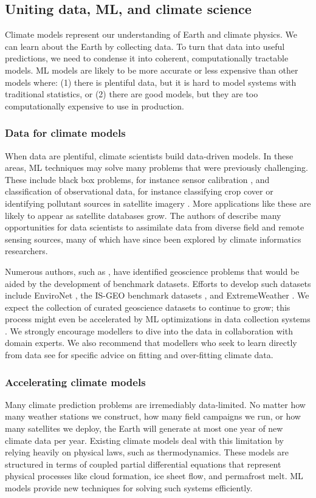 \documentclass[11pt]{report}
\begin{document}
\subsection{Uniting data, ML, and climate science}
\label{sec:climate-models-params}
Climate models represent our understanding of Earth and climate physics. We can learn about the Earth by collecting data. To turn that data into useful predictions, we need to condense it into coherent, computationally tractable models.
ML models are likely to be more accurate or less expensive than other models where:
(1) there is plentiful data, but it is hard to model systems with traditional statistics, or
(2) there are good models, but they are too computationally expensive to use in production.

\subsubsection{Data for climate models}
When data are plentiful, 
climate scientists build data-driven models. In these areas, ML techniques may solve many problems that were previously challenging.
These include black box problems, for instance sensor calibration \cite{Lary2009}, and classification of observational data, for instance classifying crop cover or identifying pollutant sources in satellite imagery \cite{Lary2015,Kussul2017}.
More applications like these are likely to appear as satellite databases grow. 
The authors of \cite{Monteleoni2013chapter} describe many opportunities for data scientists to assimilate data from diverse field and remote sensing sources, many of which have since been explored by climate informatics researchers.

Numerous authors, such as \cite{Gil2019}, have identified geoscience problems that would be aided by the development of benchmark datasets. Efforts to develop such datasets include
EnviroNet \cite{Mukkavilli2019}, the IS-GEO benchmark datasets \cite{Ebert2017}, and ExtremeWeather \cite{Racah2017}. 
We expect the collection of curated geoscience datasets to continue to grow;
this process might even be accelerated by ML optimizations in data collection systems \cite{Gil2019}.
We strongly encourage modellers to dive into the data in collaboration with domain experts.
We also recommend that modellers who seek to learn directly from data see \cite{Hourdin2017} for specific advice on fitting and over-fitting climate data.


\subsubsection{Accelerating climate models}
Many climate prediction problems are irremediably data-limited. No matter how many weather stations we construct, how many field campaigns we run, or how many satellites we deploy, the Earth will generate at most one year of new climate data per year. Existing climate models deal with this limitation by relying heavily on physical laws, such as thermodynamics.
These models are structured in terms of coupled partial differential equations that represent physical processes like cloud formation, ice sheet flow, and permafrost melt.
ML models provide new techniques for solving such systems efficiently.
\end{document}
